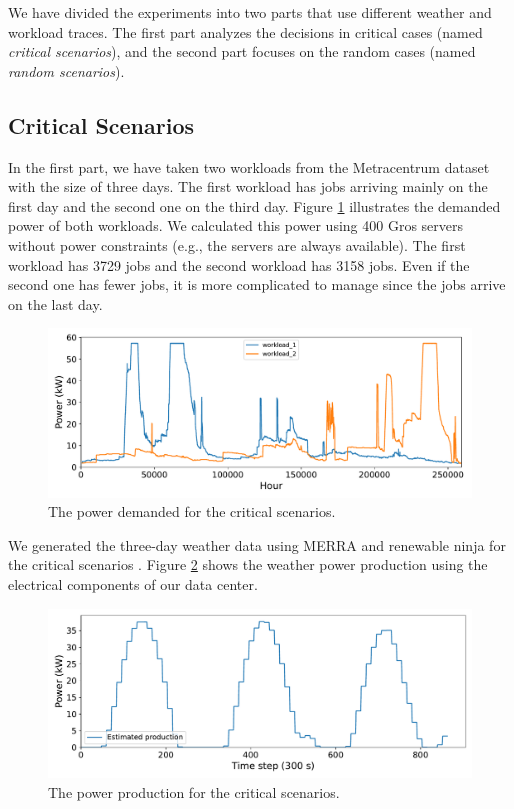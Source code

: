 We have divided the experiments into two parts that use different weather and workload traces. The first part analyzes the decisions in critical cases (named \emph{critical scenarios}), and the second part focuses on the random cases (named \emph{random scenarios}). 

\subsection{Critical Scenarios}

In the first part, we have taken two workloads from the Metracentrum dataset with the size of three days. The first workload has jobs arriving mainly on the first day and the second one on the third day. Figure \ref{fig:critical_workload} illustrates the demanded power of both workloads. We calculated this power using 400 Gros servers without power constraints (e.g., the servers are always available). The first workload has 3729 jobs and the second workload has 3158 jobs. Even if the second one has fewer jobs, it is more complicated to manage since the jobs arrive on the last day.

\begin{figure}[!htb]
    \centering
    \includegraphics[scale=0.58]{Images/Compensations/critical_jobs_arriving.pdf}
    \caption{The power demanded for the critical scenarios.}
    \label{fig:critical_workload}
\end{figure}

We generated the three-day weather data using MERRA and renewable ninja for the critical scenarios \cite{rienecker2011merra, pfenninger2016long, staffell2016using}. Figure \ref{fig:critical_weather} shows the weather power production using the electrical components of our data center. 

\begin{figure}[!htb]
    \centering
    \includegraphics[scale=0.58]{Images/Compensations/critical_power_production.pdf}
    \caption{The power production for the critical scenarios.}
    \label{fig:critical_weather}
\end{figure}

